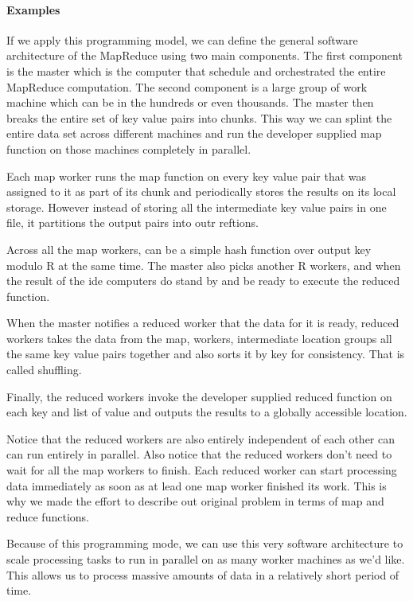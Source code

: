 \paragraph{Examples}

If we apply this programming model, we can define the general software architecture of the MapReduce using two main components.
The first component is the master which is the computer that schedule and orchestrated the entire MapReduce computation.
The second component is a large group of work machine which can be in the hundreds or even thousands.
The master then breaks the entire set of key value pairs into chunks.
This way we can splint the entire data set across different machines and run the developer supplied map function on those machines completely in parallel.

Each map worker runs the map function on every key value pair that was assigned to it as part of its chunk and periodically stores the results on its local storage.
However instead of storing all the intermediate key value pairs in one file, it partitions the output pairs into outr reftions.

Across all the map workers, can be a simple hash function over output key modulo R at the same time.
The master also picks another R workers, and when the result of the ide computers do stand by and be ready to execute the reduced function.

When the master notifies a reduced worker that the data for it is ready, reduced workers takes the data from the map, workers, intermediate location groups all the same key value pairs together and also sorts it by key for consistency.
That is called shuffling.

Finally, the reduced workers invoke the developer supplied reduced function on each key and list of value and outputs the results to a globally accessible location.

Notice that the reduced workers are also entirely independent of each other can can run entirely in parallel.
Also notice that the reduced workers don't need to wait for all the map workers to finish.
Each reduced worker can start processing data immediately as soon as at lead one map worker finished its work.
This is why we made the effort to describe out original problem in terms of map and reduce functions.

Because of this programming mode, we can use this very software architecture to scale processing tasks to run in parallel on as many worker machines as we'd like.
This allows us to process massive amounts of data in a relatively short period of time.

